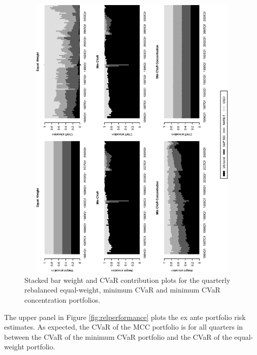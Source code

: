 \documentclass[12pt,a4paper]{article}
\begin{document}
\begin{figure}[t]
\begin{center}
\vspace{-1cm}
\caption{Stacked bar weight and CVaR contribution plots for the quarterly rebalanced equal-weight, minimum CVaR and minimum CVaR concentration portfolios. \label{fig:weightcvar_allocation_dynamic}} \vspace{-1cm}
\includegraphics[width=12cm,height=14cm,angle=270]{stackedweightsriskcont_benchmark_CC.eps}
\end{center}
\end{figure}




The upper panel in Figure \ref{fig:relperformance} plots the ex ante portfolio risk estimates. As expected, the CVaR of the MCC portfolio is for all quarters in between the CVaR of the minimum CVaR portfolio and the CVaR of the equal-weight portfolio.
\end{document}
